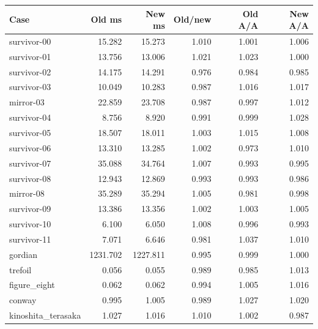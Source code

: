 \begin{center}\small
\begin{tabular}{lrrrrr}
\toprule
Case & Old ms & New ms & Old/new & Old A/A & New A/A \\
\midrule
survivor-00 & 15.282 & 15.273 & 1.010 & 1.001 & 1.006 \\
survivor-01 & 13.756 & 13.006 & 1.021 & 1.023 & 1.000 \\
survivor-02 & 14.175 & 14.291 & 0.976 & 0.984 & 0.985 \\
survivor-03 & 10.049 & 10.283 & 0.987 & 1.016 & 1.017 \\
mirror-03 & 22.859 & 23.708 & 0.987 & 0.997 & 1.012 \\
survivor-04 & 8.756 & 8.920 & 0.991 & 0.999 & 1.028 \\
survivor-05 & 18.507 & 18.011 & 1.003 & 1.015 & 1.008 \\
survivor-06 & 13.310 & 13.285 & 1.002 & 0.973 & 1.010 \\
survivor-07 & 35.088 & 34.764 & 1.007 & 0.993 & 0.995 \\
survivor-08 & 12.943 & 12.869 & 0.993 & 0.993 & 0.986 \\
mirror-08 & 35.289 & 35.294 & 1.005 & 0.981 & 0.998 \\
survivor-09 & 13.386 & 13.356 & 1.002 & 1.003 & 1.005 \\
survivor-10 & 6.100 & 6.050 & 1.008 & 0.996 & 0.993 \\
survivor-11 & 7.071 & 6.646 & 0.981 & 1.037 & 1.010 \\
gordian & 1231.702 & 1227.811 & 0.995 & 0.999 & 1.000 \\
trefoil & 0.056 & 0.055 & 0.989 & 0.985 & 1.013 \\
figure\_eight & 0.062 & 0.062 & 0.994 & 1.005 & 1.016 \\
conway & 0.995 & 1.005 & 0.989 & 1.027 & 1.020 \\
kinoshita\_terasaka & 1.027 & 1.016 & 1.010 & 1.002 & 0.987 \\
\bottomrule
\end{tabular}
\end{center}
